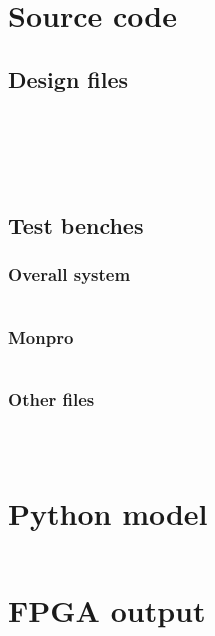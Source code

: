 \appendix
\section{Source code}
\subsection{Design files}
\inputminted{VHDL}{../RSA/RSA.srcs/sources/rsa.vhd}
\inputminted{VHDL}{../RSA/RSA.srcs/sources/u_rsa_controller.vhd}
\inputminted{VHDL}{../RSA/RSA.srcs/sources/u_rsa_datapath.vhd}
\inputminted{VHDL}{../RSA/RSA.srcs/sources/monpro.vhd}
\inputminted{VHDL}{../RSA/RSA.srcs/sources/u_monpro_controller.vhd}
\inputminted{VHDL}{../RSA/RSA.srcs/sources/u_monpro_datapath.vhd}

\subsection{Test benches}
\label{app:test_bench}
\subsubsection{Overall system}
\label{app:rsa_tb}
\inputminted{VHDL}{../RSA/RSA.srcs/sim/RSACoreTestBench.vhd}
\subsubsection{Monpro}
\label{app:monpro_tb}
\inputminted{VHDL}{../RSA/RSA.srcs/sim/RSA_Monpro_tb.vhd}
\subsubsection{Other files}
\label{app:others}
\inputminted{VHDL}{../RSA/RSA.srcs/sim/RSAParameters.vhd}
\inputminted{VHDL}{../RSA/RSA.srcs/sim/CompDecl.vhd}
\inputminted{text}{../RSA/RSA.srcs/sim/ComFile.txt}

\section{Python model}
\label{app:python}
\inputminted{python}{../model.py}

\section{FPGA output}
\label{app:fpga_output}
\inputminted{text}{../fpga_output.txt}